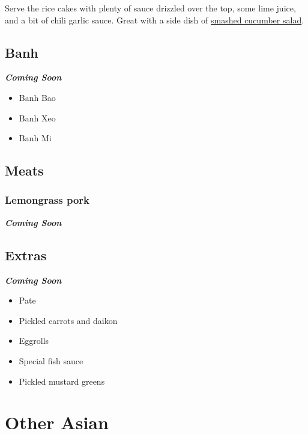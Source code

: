 \documentclass[
]{book}
\begin{document}
Serve the rice cakes with plenty of sauce drizzled over the top, some lime juice, and a bit of chili garlic sauce. Great with a side dish of \protect\hyperlink{cucsalad}{smashed cucumber salad}.

\hypertarget{banh}{%
\section*{Banh}\label{banh}}

\textbf{\emph{Coming Soon}}

\begin{itemize}
\item
  Banh Bao
\item
  Banh Xeo
\item
  Banh Mi
\end{itemize}

\hypertarget{meats}{%
\section*{Meats}\label{meats}}

\hypertarget{lgpork}{%
\subsection*{Lemongrass pork}\label{lgpork}}

\textbf{\emph{Coming Soon}}

\hypertarget{extras}{%
\section*{Extras}\label{extras}}

\textbf{\emph{Coming Soon}}

\begin{itemize}
\item
  Pate
\item
  Pickled carrots and daikon
\item
  Eggrolls
\item
  Special fish sauce
\item
  Pickled mustard greens
\end{itemize}

\hypertarget{other-asian}{%
\chapter*{Other Asian}\label{other-asian}}
\end{document}
